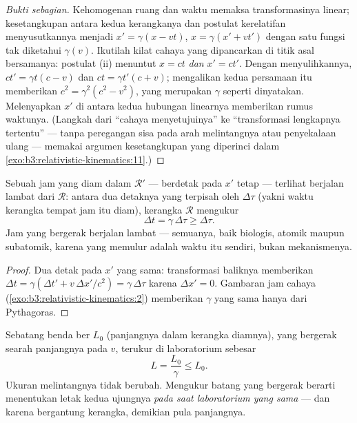 \begin{proof}[Bukti sebagian]
Kehomogenan ruang dan waktu memaksa transformasinya linear;
kesetangkupan antara kedua kerangkanya dan postulat kerelatifan
menyusutkannya menjadi $x' = \gamma(x - vt)$, $x = \gamma(x' + vt')$
dengan satu fungsi tak diketahui $\gamma(v)$. Ikutilah kilat cahaya
yang dipancarkan di titik asal bersamanya: postulat (ii) menuntut
$x = ct$ \emph{dan} $x' = ct'$. Dengan menyulihkannya, $ct' = \gamma t(c - v)$
dan $ct = \gamma t'(c + v)$; mengalikan kedua persamaan itu memberikan
$c^2 = \gamma^2(c^2 - v^2)$, yang merupakan $\gamma$ seperti dinyatakan.
Melenyapkan $x'$ di antara kedua hubungan linearnya memberikan rumus
waktunya. (Langkah dari ``cahaya menyetujuinya'' ke ``transformasi
lengkapnya tertentu'' --- tanpa peregangan sisa pada arah melintangnya
atau penyekalaan ulang --- memakai argumen kesetangkupan yang diperinci
dalam \cref{exo:b3:relativistic-kinematics:11}.)
\end{proof}

\begin{proposition}\label{prop:b3:relativistic-kinematics:dilation}
Sebuah jam yang diam dalam $\mathcal R'$ --- berdetak pada $x'$ tetap
--- terlihat berjalan lambat dari $\mathcal R$: antara dua detaknya yang
terpisah oleh \emph{} $\Delta\tau$ (yakni waktu kerangka
tempat jam itu diam), kerangka $\mathcal R$ mengukur
\[
\Delta t = \gamma\,\Delta\tau \ge \Delta\tau .
\]
Jam yang bergerak berjalan lambat --- semuanya, baik biologis, atomik
maupun subatomik, karena yang memulur adalah waktu itu sendiri, bukan
mekanismenya.
\end{proposition}

\begin{proof}
Dua detak pada $x'$ yang sama: transformasi baliknya memberikan $\Delta t
= \gamma(\Delta t' + v\,\Delta x'/c^2) = \gamma\,\Delta\tau$ karena
$\Delta x' = 0$. Gambaran jam cahaya
(\cref{exo:b3:relativistic-kinematics:2}) memberikan $\gamma$ yang sama
hanya dari Pythagoras.
\end{proof}

\begin{proposition}\label{prop:b3:relativistic-kinematics:contraction}
Sebatang benda ber\emph{} $L_0$ (panjangnya dalam kerangka
diamnya), yang bergerak searah panjangnya pada $v$, terukur di
laboratorium sebesar
\[
L = \frac{L_0}{\gamma} \le L_0 .
\]
Ukuran melintangnya tidak berubah. Mengukur batang yang bergerak berarti
menentukan letak kedua ujungnya \emph{pada saat laboratorium yang sama}
--- dan karena  bergantung kerangka, demikian pula panjangnya.
\end{proposition}

